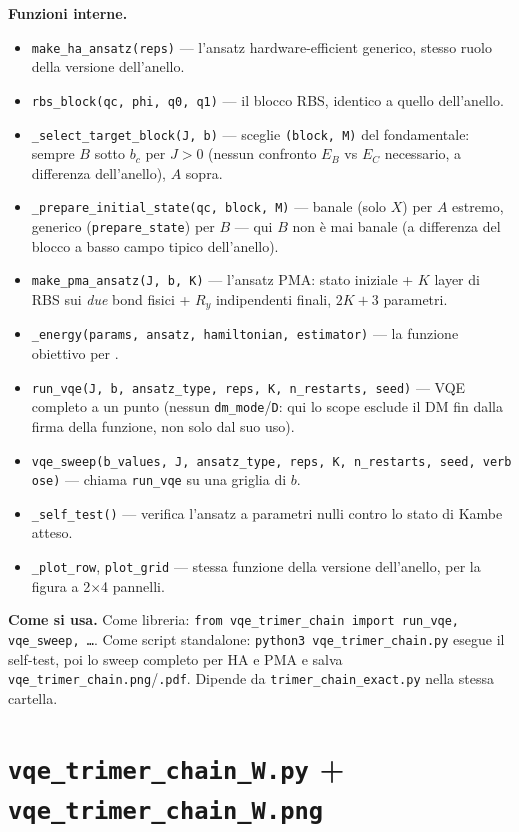\documentclass[11pt,a4paper]{article}
\begin{document}
\textbf{Funzioni interne.}
\begin{itemize}
\item \texttt{make\_ha\_ansatz(reps)} — l'ansatz hardware-efficient generico, stesso
ruolo della versione dell'anello.
\item \texttt{rbs\_block(qc,\ phi,\ q0,\ q1)} — il blocco RBS, identico a quello
dell'anello.
\item \texttt{\_select\_target\_block(J,\ b)} — sceglie \texttt{(block, M)} del
fondamentale: sempre $B$ sotto $b_c$ per $J>0$ (nessun confronto $E_B$ vs $E_C$
necessario, a differenza dell'anello), $A$ sopra.
\item \texttt{\_prepare\_initial\_state(qc,\ block,\ M)} — banale (solo $X$) per
$A$ estremo, generico (\texttt{prepare\_state}) per $B$ — qui $B$ non è mai banale
(a differenza del blocco a basso campo tipico dell'anello).
\item \texttt{make\_pma\_ansatz(J,\ b,\ K)} — l'ansatz PMA: stato iniziale + $K$
layer di RBS sui \emph{due} bond fisici + $R_y$ indipendenti finali, $2K+3$
parametri.
\item \texttt{\_energy(params,\ ansatz,\ hamiltonian,\ estimator)} — la funzione
obiettivo per \texttt{}.
\item \texttt{run\_vqe(J,\ b,\ ansatz\_type,\ reps,\ K,\ n\_restarts,\ seed)} — VQE
completo a un punto (nessun \texttt{dm\_mode}/\texttt{D}: qui lo scope esclude il DM
fin dalla firma della funzione, non solo dal suo uso).
\item \texttt{vqe\_sweep(b\_values,\ J,\ ansatz\_type,\ reps,\ K,\ n\_restarts,\
seed,\ verbose)} — chiama \texttt{run\_vqe} su una griglia di $b$.
\item \texttt{\_self\_test()} — verifica l'ansatz a parametri nulli contro lo stato
di Kambe atteso.
\item \texttt{\_plot\_row}, \texttt{plot\_grid} — stessa funzione della versione
dell'anello, per la figura a 2$\times$4 pannelli.
\end{itemize}

\textbf{Come si usa.} Come libreria: \texttt{from vqe\_trimer\_chain import
run\_vqe, vqe\_sweep, \ldots}. Come script standalone: \texttt{python3
vqe\_trimer\_chain.py} esegue il self-test, poi lo sweep completo per HA e PMA e
salva \texttt{vqe\_trimer\_chain.png}/\texttt{.pdf}. Dipende da
\texttt{trimer\_chain\_exact.py} nella stessa cartella.

\section*{\texttt{vqe\_trimer\_chain\_W.py} + \texttt{vqe\_trimer\_chain\_W.png}}
\end{document}
